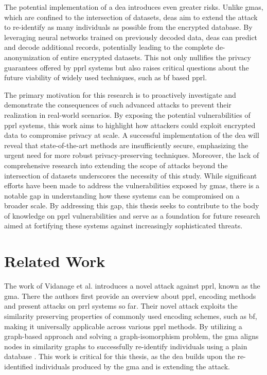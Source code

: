 The potential implementation of a \ac{dea} introduces even greater risks. 
Unlike \ac{gma}s, which are confined to the intersection of datasets, \ac{dea}s aim to extend the attack to re-identify as many individuals as possible from the encrypted database. 
By leveraging neural networks trained on previously decoded data, \ac{dea}s can predict and decode additional records, potentially leading to the complete de-anonymization of entire encrypted datasets. 
This not only nullifies the privacy guarantees offered by \ac{pprl} systems but also raises critical questions about the future viability of widely used techniques, such as \ac{bf} based \ac{pprl}.

The primary motivation for this research is to proactively investigate and demonstrate the consequences of such advanced attacks to prevent their realization in real-world scenarios.
By exposing the potential vulnerabilities of \ac{pprl} systems, this work aims to highlight how attackers could exploit encrypted data to compromise privacy at scale. 
A successful implementation of the \ac{dea} will reveal that state-of-the-art methods are insufficiently secure, emphasizing the urgent need for more robust privacy-preserving techniques.
Moreover, the lack of comprehensive research into extending the scope of attacks beyond the intersection of datasets underscores the necessity of this study. 
While significant efforts have been made to address the vulnerabilities exposed by \ac{gma}s, there is a notable gap in understanding how these systems can be compromised on a broader scale.
By addressing this gap, this thesis seeks to contribute to the body of knowledge on \ac{pprl} vulnerabilities and serve as a foundation for future research aimed at fortifying these systems against increasingly sophisticated threats.



\section{Related Work}  \label{sec:rel-work}

The work of Vidanage et al. \cite{vidanage2020graph} introduces a novel attack against \ac{pprl}, known as the \ac{gma}.
There the authors first provide an overview about \ac{pprl}, encoding methods and present attacks on \ac{prrl} systems so far.
Their novel attack exploits the similarity preserving properties of commonly used encoding schemes, such as \ac{bf}, making it universally applicable across various \ac{pprl} methods.
By utilizing a graph-based approach and solving a graph-isomorphism problem, the \ac{gma} aligns nodes in similarity graphs to successfully re-identify individuals using a plain database \cite{vidanage2020graph}.
This work is critical for this thesis, as the \ac{dea} builds upon the re-identified individuals produced by the \ac{gma} and is extending the attack.

